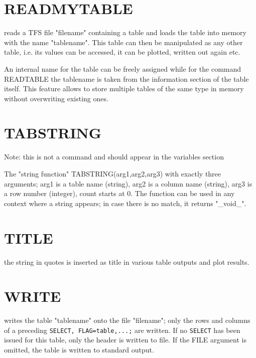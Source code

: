 \section{READMYTABLE}
\label{sec:readmytable}
reads a TFS file "filename" containing a \mad table and loads the table
into memory with the name "tablename". This table
can then be manipulated as any other table, i.e. its values can be
accessed, it can be plotted, written out again etc. 

An internal name for the table can be freely assigned while for the
command READTABLE the tablename is taken from the information section of
the table itself.  
This feature allows to store multiple tables of the same type in memory without
overwriting existing ones.   

\section{TABSTRING}
\label{sec:tabstring}
Note: this is not a command and should appear in the variables section

The "string function" TABSTRING(arg1,arg2,arg3) with exactly  three
arguments; arg1 is a table name (string), arg2 is a column name
(string), arg3 is a row number (integer), count starts at 0. The
function can be used in any context where a string appears; in case
there is no match, it returns "\_void\_".  

\section{TITLE}
\label{sec:title}
the string in quotes is inserted as title in various table outputs and
plot results.  

\section{WRITE}
\label{sec:write}
writes the table "tablename" onto the file "filename"; only the rows and
columns of a preceding \texttt{SELECT, FLAG=table,...;} are written. 
If no \texttt{SELECT} has been issued for this table, only the header is
written to file.
If the FILE argument is omitted, the table is written to standard output.  





